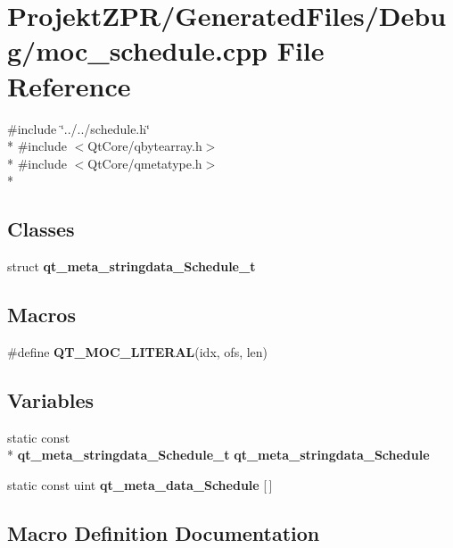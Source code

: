 \section{Projekt\-Z\-P\-R/\-Generated\-Files/\-Debug/moc\-\_\-schedule.cpp File Reference}
\label{_debug_2moc__schedule_8cpp}
{\ttfamily \#include \char`\"{}../../schedule.\-h\char`\"{}}\\*
{\ttfamily \#include $<$Qt\-Core/qbytearray.\-h$>$}\\*
{\ttfamily \#include $<$Qt\-Core/qmetatype.\-h$>$}\\*
\subsection*{Classes}
\begin{DoxyCompactItemize}
\item 
struct {\bf qt\-\_\-meta\-\_\-stringdata\-\_\-\-Schedule\-\_\-t}
\end{DoxyCompactItemize}
\subsection*{Macros}
\begin{DoxyCompactItemize}
\item 
\#define {\bf Q\-T\-\_\-\-M\-O\-C\-\_\-\-L\-I\-T\-E\-R\-A\-L}(idx, ofs, len)
\end{DoxyCompactItemize}
\subsection*{Variables}
\begin{DoxyCompactItemize}
\item 
static const \\*
{\bf qt\-\_\-meta\-\_\-stringdata\-\_\-\-Schedule\-\_\-t} {\bf qt\-\_\-meta\-\_\-stringdata\-\_\-\-Schedule}
\item 
static const uint {\bf qt\-\_\-meta\-\_\-data\-\_\-\-Schedule} [$\,$]
\end{DoxyCompactItemize}


\subsection{Macro Definition Documentation}
